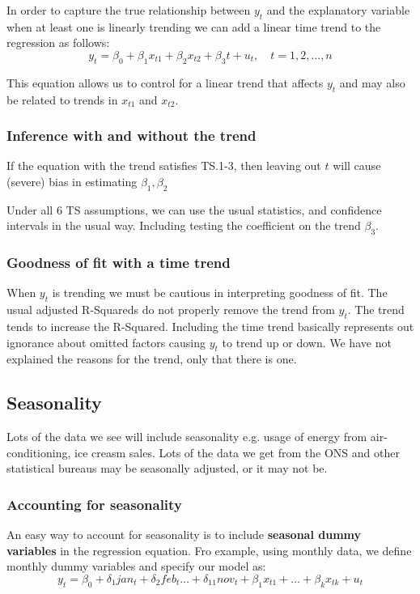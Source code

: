 \documentclass[11pt]{article}
\begin{document}
In order to capture the true relationship between $y_t$ and the explanatory variable when at least one is linearly trending we can add a linear time trend to the regression as follows:
\[y_t = \beta_0 + \beta_1 x_{t1} + \beta_2 x_{t2} + \beta_3 t + u_t, \quad t = 1,2,\ldots, n\]

This equation allows us to control for a linear trend that affects $y_t$ and may also be related to trends in $x_{t1}$ and $x_{t2}$.

\subsubsection{Inference with and without the trend}

If the equation with the trend satisfies TS.1-3, then leaving out $t$ will cause (severe) bias in estimating $\beta_1, \beta_2$

Under all 6 TS assumptions, we can use the usual statistics, and confidence intervals in the usual way. Including testing the coefficient on the trend $\beta_3$.

\subsubsection{Goodness of fit with a time trend}

When $y_t$ is trending we must be cautious in interpreting goodness of fit. The usual adjusted R-Squareds do not properly remove the trend from $y_t$. The trend tends to increase the R-Squared. Including the time trend basically represents out ignorance about omitted factors causing $y_t$ to trend up or down. We have not explained the reasons for the trend, only that there is one.


\subsection{Seasonality}

Lots of the data we see will include seasonality e.g. usage of energy from air-conditioning, ice creasm sales. Lots of the data we get from the ONS and other statistical bureaus may be seasonally adjusted, or it may not be.

\subsubsection{Accounting for seasonality}

An easy way to account for seasonality is to include \textbf{seasonal dummy variables} in the regression equation. Fro example, using monthly data, we define monthly dummy variables and specify our model as:
\[y_t = \beta_0 + \delta_1 jan_t + \delta_2 feb_t \ldots + \delta_{11} nov_t + \beta_1 x_{t1} + \ldots + \beta_k x_{tk} + u_t\]
\end{document}
